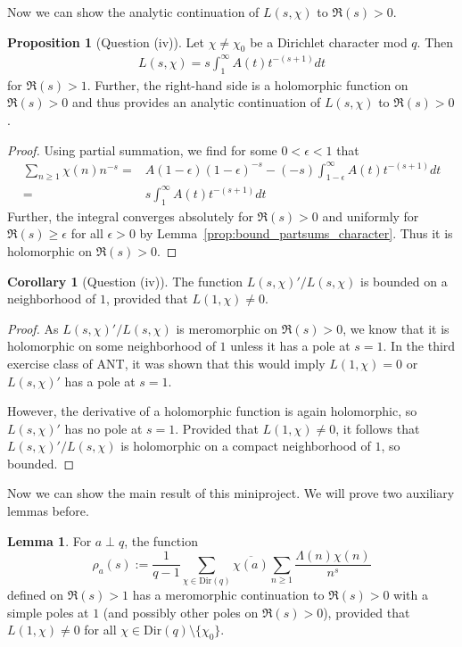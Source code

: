 \documentclass{scrartcl}
\theoremstyle{definition}
\newtheorem{lemma}[definition]{Lemma}
\newtheorem{proposition}[definition]{Proposition}
\newtheorem{corollary}[definition]{Corollary}
\begin{document}
Now we can show the analytic continuation of $L(s, \chi)$ to $\Re(s) > 0$.
\begin{proposition}[Question (iv)]
    Let $\chi \neq \chi_0$ be a Dirichlet character mod $q$.
    Then
    \begin{align*}
        L(s, \chi) = s \int_1^\infty A(t) t^{-(s + 1)} dt
    \end{align*}
    for $\Re(s) > 1$.
    Further, the right-hand side is a holomorphic function on $\Re(s) > 0$ and thus provides an analytic continuation of $L(s, \chi)$ to $\Re(s) > 0$.
\end{proposition}
\begin{proof}
    Using partial summation, we find for some $0 < \epsilon < 1$ that
    \begin{align*}
        \sum_{n \geq 1} \chi(n) n^{-s} =& A(1 - \epsilon) (1 - \epsilon)^{-s} - (-s) \int_{1 - \epsilon}^\infty A(t) t^{-(s + 1)} dt \\
        =& s \int_1^\infty A(t) t^{-(s + 1)} dt
    \end{align*}
    Further, the integral converges absolutely for $\Re(s) > 0$ and uniformly for $\Re(s) \geq \epsilon$ for all $\epsilon > 0$ by Lemma~\ref{prop:bound_partsums_character}.
    Thus it is holomorphic on $\Re(s) > 0$.
\end{proof}
\begin{corollary}[Question (iv)]
    \label{prop:logarithmic_derivative_L_bounded}
    The function $L(s, \chi)'/L(s, \chi)$ is bounded on a neighborhood of $1$, provided that $L(1, \chi) \neq 0$.
\end{corollary}
\begin{proof}
    As $L(s, \chi)'/L(s, \chi)$ is meromorphic on $\Re(s) > 0$, we know that it is holomorphic on some neighborhood of $1$ unless it has a pole at $s = 1$.
    In the third exercise class of ANT, it was shown that this would imply $L(1, \chi) = 0$ or $L(s, \chi)'$ has a pole at $s = 1$.

    However, the derivative of a holomorphic function is again holomorphic, so $L(s, \chi)'$ has no pole at $s = 1$.
    Provided that $L(1, \chi) \neq 0$, it follows that $L(s, \chi)'/L(s, \chi)$ is holomorphic on a compact neighborhood of $1$, so bounded.
\end{proof}
Now we can show the main result of this miniproject.
We will prove two auxiliary lemmas before.
\begin{lemma}
    \label{prop:rho_pole_at_one}
    For $a \perp q$, the function
    \begin{equation*}
        \rho_a(s) := \frac 1 {q - 1} \sum_{\chi \in \mathrm{Dir}(q)} \overline{\chi(a)} \sum_{n \geq 1} \frac {\Lambda(n) \chi(n)} {n^s}
    \end{equation*}
    defined on $\Re(s) > 1$ has a meromorphic continuation to $\Re(s) > 0$ with a simple poles at $1$ (and possibly other poles on $\Re(s) > 0$), provided that $L(1, \chi) \neq 0$ for all $\chi \in \mathrm{Dir}(q) \setminus \{ \chi_0 \}$.
\end{lemma}
\end{document}
